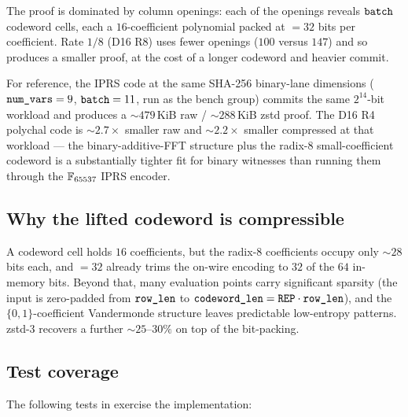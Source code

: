 \noindent The proof is dominated by column openings: each of the
 openings reveals $\texttt{batch}$ codeword
cells, each a $16$-coefficient polynomial packed at $=32$
bits per coefficient. Rate $1/8$ (D16 R8) uses fewer openings ($100$
versus $147$) and so produces a smaller proof, at the cost of a longer
codeword and heavier commit.

For reference, the IPRS code at the same SHA-256 binary-lane
dimensions ($\texttt{num\_vars} = 9$, $\texttt{batch} = 11$, run as the
 bench group) commits the same
$2^{14}$-bit workload and produces a $\sim 479$\,KiB raw /
$\sim 288$\,KiB zstd proof. The D16 R4 polychal code is $\sim 2.7\times$
smaller raw and $\sim 2.2\times$ smaller compressed at that workload ---
the binary-additive-FFT structure plus the radix-8 small-coefficient
codeword is a substantially tighter fit for binary witnesses than
running them through the $\mathbb{F}_{65537}$ IPRS encoder.

\subsection{Why the lifted codeword is compressible}

A codeword cell holds $16$  coefficients, but the radix-8
coefficients occupy only $\sim 28$ bits each, and $=32$
already trims the on-wire encoding to $32$ of the $64$ in-memory bits.
Beyond that, many evaluation points carry significant sparsity (the
input is zero-padded from $\texttt{row\_len}$ to
$\texttt{codeword\_len} = \texttt{REP}\cdot\texttt{row\_len}$), and the
$\{0,1\}$-coefficient Vandermonde structure leaves predictable
low-entropy patterns. zstd-3 recovers a further $\sim 25$--$30\%$ on
top of the bit-packing.

\subsection{Test coverage}

The following tests in
 exercise the
implementation:

